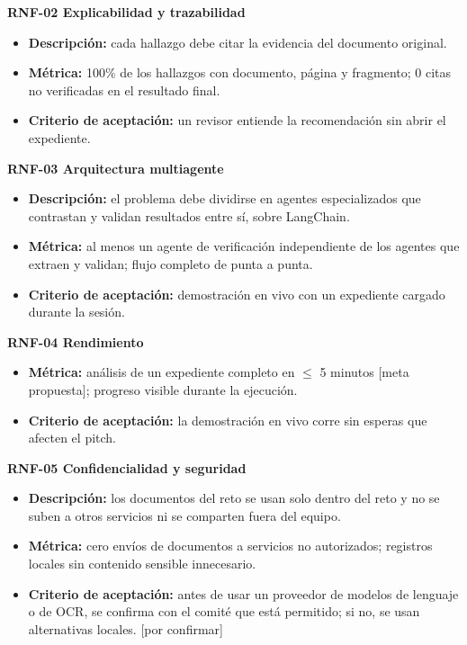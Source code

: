 \documentclass[11pt, a4paper]{article}
\begin{document}
\textbf{RNF-02 Explicabilidad y trazabilidad}
\begin{itemize}
    \item \textbf{Descripción:} cada hallazgo debe citar la evidencia del documento original.
    \item \textbf{Métrica:} 100\% de los hallazgos con documento, página y fragmento; 0 citas no verificadas en el resultado final.
    \item \textbf{Criterio de aceptación:} un revisor entiende la recomendación sin abrir el expediente.
\end{itemize}

\textbf{RNF-03 Arquitectura multiagente}
\begin{itemize}
    \item \textbf{Descripción:} el problema debe dividirse en agentes especializados que contrastan y validan resultados entre sí, sobre LangChain.
    \item \textbf{Métrica:} al menos un agente de verificación independiente de los agentes que extraen y validan; flujo completo de punta a punta.
    \item \textbf{Criterio de aceptación:} demostración en vivo con un expediente cargado durante la sesión.
\end{itemize}

\textbf{RNF-04 Rendimiento}
\begin{itemize}
    \item \textbf{Métrica:} análisis de un expediente completo en $\le$ 5 minutos [meta propuesta]; progreso visible durante la ejecución.
    \item \textbf{Criterio de aceptación:} la demostración en vivo corre sin esperas que afecten el pitch.
\end{itemize}

\textbf{RNF-05 Confidencialidad y seguridad}
\begin{itemize}
    \item \textbf{Descripción:} los documentos del reto se usan solo dentro del reto y no se suben a otros servicios ni se comparten fuera del equipo.
    \item \textbf{Métrica:} cero envíos de documentos a servicios no autorizados; registros locales sin contenido sensible innecesario.
    \item \textbf{Criterio de aceptación:} antes de usar un proveedor de modelos de lenguaje o de OCR, se confirma con el comité que está permitido; si no, se usan alternativas locales. [por confirmar]
\end{itemize}
\end{document}
